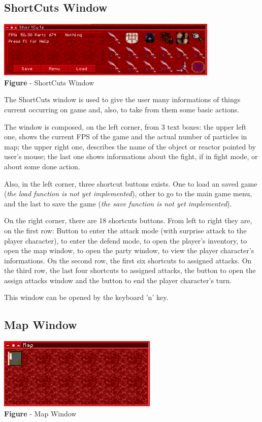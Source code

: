 \documentclass[ letterpaper,12pt]{article}
\begin{document}
\subsection{ShortCuts Window}

\begin{center}
  \includegraphics{shortcutsWindow.png}
\\{\bf Figure} - ShortCuts Window
\end{center}

The ShortCuts window is used to give the user many informations of things
current occurring on game and, also, to take from them some basic actions.

The window is composed, on the left corner, from 3 text boxes: the upper left
one, shows the current FPS of the game and the actual number of particles in
map; the upper right one, describes the name of the object or reactor pointed
by user's mouse; the last one shows informations about the fight, if in fight
mode, or about some done action.

Also, in the left corner, three shortcut buttons exists. One to load an saved
game ({\it the load function is not yet implemented}), other to go to the main
game menu, and the last to save the game ({\it the save function is not yet
implemented}).

On the right corner, there are 18 shortcuts buttons. From left to right they
are, on the first row: Button to enter the attack mode (with surprise attack to
the player character), to enter the defend mode, to open the player's
inventory, to open the map window, to open the party window, to view the player
character's informations. On the second row, the first six shortcuts to
assigned attacks. On the third row, the last four shortcuts to assigned
attacks, the button to open the assign attacks window and the button to end the
player character's turn.

This window can be opened by the keyboard 'n' key.

\subsection{Map Window}

\begin{center}
  \includegraphics{mapWindow.png}
\\{\bf Figure} - Map Window
\end{center}
\end{document}
